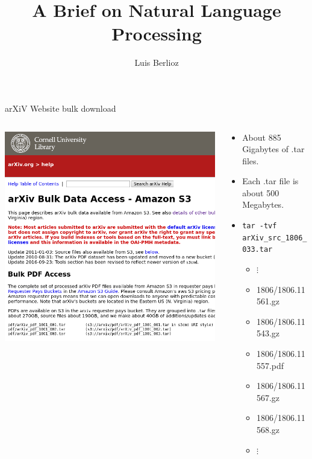 \documentclass[9pt]{beamer}
\title{A Brief on Natural Language Processing}
\author{Luis Berlioz}
\begin{document}
\maketitle


\begin{frame}{arXiV Website bulk download}
    \begin{columns}[T]
        \begin{column}{0.4\textwidth}
    \includegraphics[width=\textwidth]{bulk_download.png} 
        \end{column}
        \begin{column}{0.6\textwidth}
            \begin{itemize}
                \item About 885 Gigabytes of .tar files.
                \item Each .tar file is about 500 Megabytes.
                \item \texttt{tar -tvf arXiv\_src\_1806\_033.tar}
                    \begin{itemize}
\item \hspace{4em}      $\vdots$
\item 1806/1806.11561.gz
\item 1806/1806.11543.gz
\item 1806/1806.11557.pdf
\item 1806/1806.11567.gz
\item 1806/1806.11568.gz
\item \hspace{4em}      $\vdots$
\end{itemize}


            \end{itemize}
        \end{column}
    \end{columns}
\end{frame}
\end{document}

